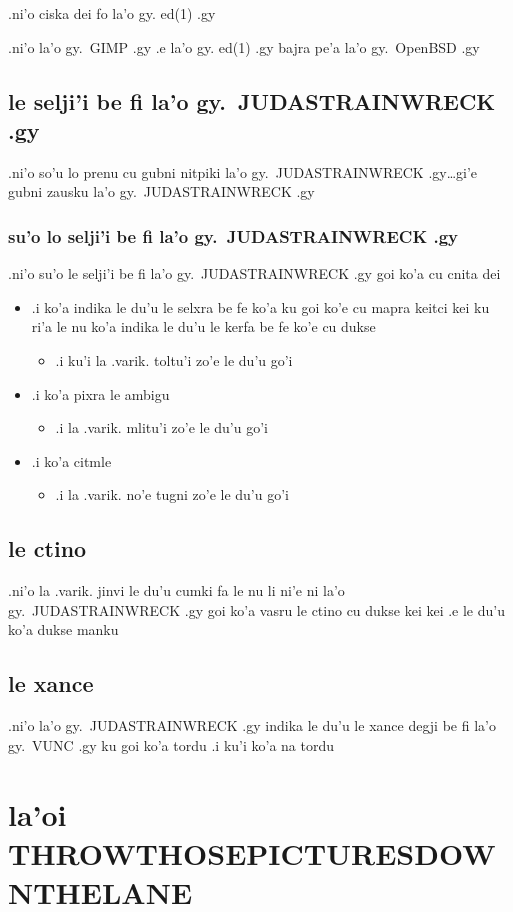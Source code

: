 \documentclass{report}
\begin{document}
.ni'o ciska dei fo la'o gy. ed(1) .gy

.ni'o la'o gy.\ GIMP .gy .e la'o gy. ed(1) .gy bajra pe'a la'o gy.\ OpenBSD .gy
\section{le selji'i be fi la'o gy.\ JUDASTRAINWRECK .gy}
.ni'o so'u lo prenu cu gubni nitpiki la'o gy.\ JUDASTRAINWRECK .gy\ldots gi'e gubni zausku la'o gy.\ JUDASTRAINWRECK .gy
\subsection{su'o lo selji'i be fi la'o gy.\ JUDASTRAINWRECK .gy}
.ni'o su'o le selji'i be fi la'o gy.\ JUDASTRAINWRECK .gy goi ko'a cu cnita dei
\begin{itemize}
	\item .i ko'a indika le du'u le selxra be fe ko'a ku goi ko'e cu mapra keitci kei ku ri'a le nu ko'a indika le du'u le kerfa be fe ko'e cu dukse 
	\begin{itemize}
		\item .i ku'i la .varik. toltu'i zo'e le du'u go'i
	\end{itemize}
	\item .i ko'a pixra le ambigu
	\begin{itemize}
		\item .i la .varik. mlitu'i zo'e le du'u go'i
	\end{itemize}
	\item .i ko'a citmle
	\begin{itemize}
		\item .i la .varik. no'e tugni zo'e le du'u go'i
	\end{itemize}
\end{itemize}
\section{le ctino}
.ni'o la .varik. jinvi le du'u cumki fa le nu li ni'e ni la'o gy.\ JUDASTRAINWRECK .gy goi ko'a vasru le ctino cu dukse kei kei .e le du'u ko'a dukse manku
\section{le xance}
.ni'o la'o gy.\ JUDASTRAINWRECK .gy indika le du'u le xance degji be fi la'o gy.\ VUNC .gy ku goi ko'a tordu  .i ku'i ko'a na tordu
\chapter{la'oi THROWTHOSEPICTURESDOWNTHELANE}
\end{document}
